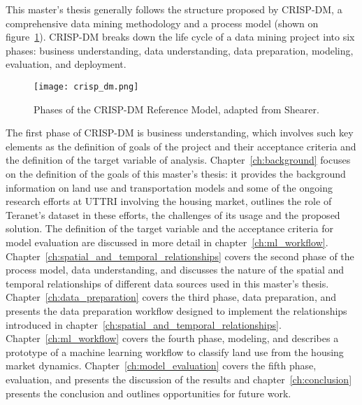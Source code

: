 This master's thesis generally follows the structure proposed by CRISP-DM, a comprehensive data mining methodology and a process model\cite{Shearer2000} (shown on figure~\ref{fig:crisp_dm}).
CRISP-DM breaks down the life cycle of a data mining project into six phases: business understanding, data understanding, data preparation, modeling, evaluation, and deployment.

\begin{figure}[hbt!]
    \centering
    \texttt{[image: crisp\_dm.png]}
    \caption{Phases of the CRISP-DM Reference Model, adapted from Shearer\cite{Shearer2000}.}
    \label{fig:crisp_dm}
\end{figure}

The first phase of CRISP-DM is business understanding, which involves such key elements as the definition of goals of the project and their acceptance criteria and the definition of the target variable of analysis\cite{Nisbet2018}.
Chapter~\ref{ch:background} focuses on the definition of the goals of this master's thesis: it provides the background information on land use and transportation models and some of the ongoing research efforts at UTTRI involving the housing market, outlines the role of Teranet's dataset in these efforts, the challenges of its usage and the proposed solution.
The definition of the target variable and the acceptance criteria for model evaluation are discussed in more detail in chapter~\ref{ch:ml_workflow}.
Chapter~\ref{ch:spatial_and_temporal_relationships} covers the second phase of the process model, data understanding, and discusses the nature of the spatial and temporal relationships of different data sources used in this master's thesis.
Chapter~\ref{ch:data_preparation} covers the third phase, data preparation, and presents the data preparation workflow designed to implement the relationships introduced in chapter~\ref{ch:spatial_and_temporal_relationships}.
Chapter~\ref{ch:ml_workflow} covers the fourth phase, modeling, and describes a prototype of a machine learning workflow to classify land use from the housing market dynamics.
Chapter~\ref{ch:model_evaluation} covers the fifth phase, evaluation, and presents the discussion of the results and chapter~\ref{ch:conclusion} presents the conclusion and outlines opportunities for future work.